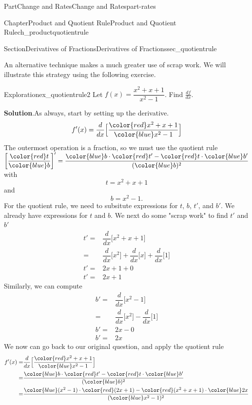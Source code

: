 \documentclass{tufte-book}
\newcommand{\blocktitlefont}{\relax}
\numberwithin{equation}{chapter}
\newcommand{\red}[1]{   {\color{red}   #1}   }
\newcommand{\blue}[1]{  {\color{blue}  #1}  }
\newcommand{\ddx}[1]{ \dfrac{d}{dx} \Big[ #1 \Big]  }
\newcommand{\amp}{&}
\begin{document}
\begin{partptx}{Part}{Change and Rates}{}{Change and Rates}{}{}{part-rates}
\begin{chapterptx}{Chapter}{Product and Quotient Rule}{}{Product and Quotient Rule}{}{}{ch_productquotientrule}
\begin{sectionptx}{Section}{Derivatives of Fractions}{}{Derivatives of Fractions}{}{}{sec_quotientrule}
\par
An alternative technique makes a much greater use of scrap work.  We will illustrate this strategy using the following exercise.%
\begin{exploration}{Exploration}{}{ex_quotientrule2}%
Let \(f(x) = \dfrac{x^2 + x + 1}{x^2 -1 }\). Find \(\frac{df}{dx}\).%
\par\smallskip%
\noindent\textbf{\blocktitlefont Solution}.\hypertarget{ex_quotientrule2-2}{}\quad{}As always,  start by setting up the derivative.%
\begin{equation*}
f'(x) = \ddx{ \dfrac{ \red{x^2 + x + 1} }{ \blue{x^2 -1} } }
\end{equation*}
The outermost operation is a fraction, so we must use the quotient rule \(\left[\dfrac{\red{t}}{\blue{b}}\right]' = \dfrac{\blue{b}\cdot \red{t'} - \red{t}\cdot \blue{b'}}{(\blue{b})^2}\) with%
\begin{equation*}
t = x^2 + x + 1
\end{equation*}
and%
\begin{equation*}
b = x^2 - 1\text{.}
\end{equation*}
For the quotient rule, we need to subsitute expressions for \(t\), \(b\), \(t'\), and \(b'\). We already have expressions for \(t\) and \(b\).  We next do some "scrap work" to find \(t'\) and \(b'\)%
\begin{align*}
t' = \amp \ddx{x^2 + x + 1} \\
= \amp \ddx{x^2} + \ddx{x} + \ddx{1}\\
t'= \amp 2x+1+ 0\\
t'= \amp 2x+1
\end{align*}
Similarly, we can compute%
\begin{align*}
b' = \amp \ddx{x^2 - 1} \\
= \amp \ddx{x^2} - \ddx{1}\\
b'= \amp 2x - 0\\
b'= \amp 2x
\end{align*}
We now can go back to our original question, and apply the quotient rule%
\begin{align*}
f'(x) = \amp \ddx{ \dfrac{ \red{x^2 + x + 1} }{ \blue{x^2 -1} } }\\
=  \amp \dfrac{\blue{b}\cdot \red{t'} - \red{t}\cdot \blue{b'}}{(\blue{b})^2}\\
= \amp \dfrac{\blue{(x^2 - 1)}\cdot \red{(2x+1)} - \red{(x^2 + x + 1)}\cdot \blue{2x}}{(\blue{x^2 - 1})^2} 
\end{align*}
%
\end{exploration}%

\end{sectionptx}
\end{chapterptx}
\end{partptx}
\end{document}
